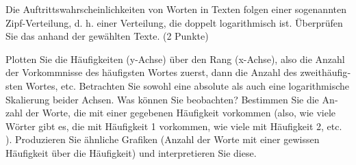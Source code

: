 Die Auftrittswahrschein­lichkeit­en von Worten in Tex­ten fol­gen einer 
so­ge­nan­nten Zipf-Verteilung, d.​ h.​ einer Verteilung, die dop­pelt 
log­a­rith­misch ist.​ Überprüfen Sie das an­hand der gewählten Texte.​ (2 
Punk­te)

    Plot­ten Sie die Häufigkeit­en (y-Achse) über den Rang (x-Achse), also die 
An­zahl der Vorkomm­nisse des häufig­sten Wortes zuerst, dann die An­zahl des 
zwei­thäufig­sten Wortes, etc.​ Betra­cht­en Sie sowohl eine ab­so­lute als auch 
eine log­a­rith­mis­che Skalierung bei­der Achsen.​ Was können Sie beobacht­en?
    Bes­tim­men Sie die An­zahl der Worte, die mit einer gegebe­nen Häufigkeit 
vorkom­men (also, wie viele Wörter gibt es, die mit Häufigkeit 1 vorkom­men, wie 
viele mit Häufigkeit 2, etc.​ ).​ Pro­duzieren Sie ähn­liche Grafiken (An­zahl 
der Worte mit einer gewis­sen Häufigkeit über die Häufigkeit) und 
in­ter­pretieren Sie diese.